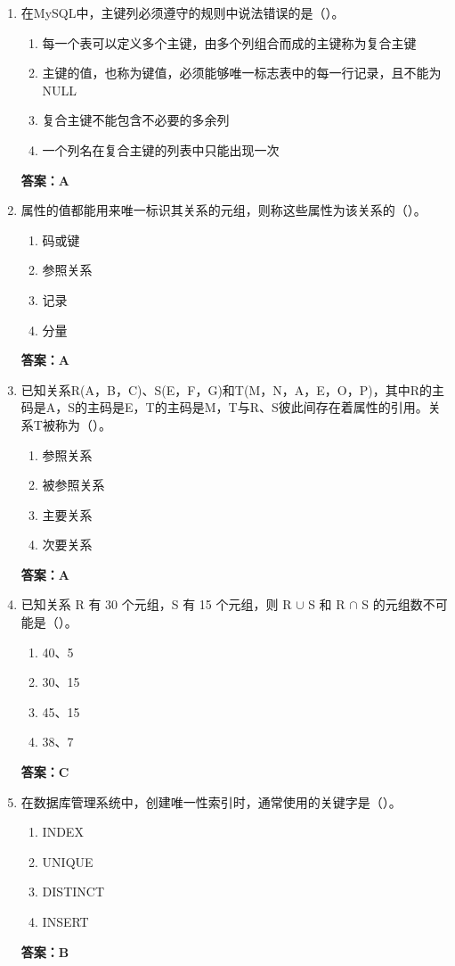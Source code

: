 \documentclass[12pt, a4paper]{article}
\begin{document}
\begin{enumerate}[label=\arabic*.]
	\item 在MySQL中，主键列必须遵守的规则中说法错误的是（\quad）。
	      \begin{enumerate}
		      \item 每一个表可以定义多个主键，由多个列组合而成的主键称为复合主键
		      \item 主键的值，也称为键值，必须能够唯一标志表中的每一行记录，且不能为NULL
		      \item 复合主键不能包含不必要的多余列
		      \item 一个列名在复合主键的列表中只能出现一次
	      \end{enumerate}
	      \textbf{答案：A}

	\item 属性的值都能用来唯一标识其关系的元组，则称这些属性为该关系的（\quad）。
	      \begin{enumerate}
		      \item 码或键
		      \item 参照关系
		      \item 记录
		      \item 分量
	      \end{enumerate}
	      \textbf{答案：A}

	\item 已知关系R(A，B，C)、S(E，F，G)和T(M，N，A，E，O，P)，其中R的主码是A，S的主码是E，T的主码是M，T与R、S彼此间存在着属性的引用。关系T被称为（\quad）。
	      \begin{enumerate}
		      \item 参照关系
		      \item 被参照关系
		      \item 主要关系
		      \item 次要关系
	      \end{enumerate}
	      \textbf{答案：A}

	\item 已知关系 R 有 30 个元组，S 有 15 个元组，则 R $\cup$ S 和 R $\cap$ S 的元组数不可能是（\quad）。
	      \begin{enumerate}
		      \item 40、5
		      \item 30、15
		      \item 45、15
		      \item 38、7
	      \end{enumerate}
	      \textbf{答案：C}

	\item 在数据库管理系统中，创建唯一性索引时，通常使用的关键字是（\quad）。
	      \begin{enumerate}
		      \item INDEX
		      \item UNIQUE
		      \item DISTINCT
		      \item INSERT
	      \end{enumerate}
	      \textbf{答案：B}


\end{enumerate}
\end{document}

